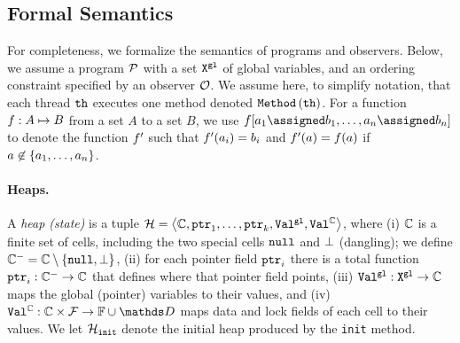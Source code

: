 
\subsection{Formal Semantics}
\label{semantics:section}
For completeness, we formalize the semantics of programs and
observers. Below, we assume a program ${\mathcal P}$  with a set 
${\tt X}^{\tt gl}$ of global variables, and an ordering constraint
specified by an observer ${\mathcal O}$.
%
We assume here, to simplify notation,
that each thread ${\tt th}$ executes one method
denoted ${\tt Method}\left({\tt th}\right)$.
For a function $f:A\mapsto B$ from a set $A$ to
a set $B$, we use 
$\fun[\aelem_1\assigned\belem_1,\ldots,\aelem_\nn\assigned\belem_\nn]$ 
to denote the function
$f'$ such that $f'(a_i)=b_i$ and 
$f'(a)=f(a)$ if 
$a\not\in\left\{a_1,\ldots,a_n\right\}$.
%

%



\paragraph{Heaps.}
A {\it heap (state)} is a tuple ${\mathcal H}=\left\langle{\mathbb C},\mathtt{ptr}_1, \ldots , \mathtt{ptr}_k,{\tt Val}^{\tt gl},{\tt Val}^{{\mathbb C}}\right\rangle$, where
(i)
${\mathbb C}$ is a finite set of cells, including the two special cells
${\tt null}$ and $\bot$ (dangling);
%
we define ${\mathbb C}^{-}={\mathbb C}\setminus\left\{{\tt null},\bot\right\}$,
%
(ii)
for each pointer field $\mathtt{ptr}_i$ there is a total function
$\mathtt{ptr}_i:{\mathbb C}^{-}\to{\mathbb C}$
that defines where that pointer field points,
(iii)
${\tt Val}^{\tt gl}:{\tt X}^{\tt gl}\to{\mathbb C}$ maps the global (pointer)
variables to their values, and
(iv)
$\cellval:\cellset\times\fieldset\to\fset\cup\ddomain$
maps data and lock fields of each cell to their values.
%
We let ${\mathcal H}_{\tt init}$ denote the initial heap produced by the
{\tt init} method.

